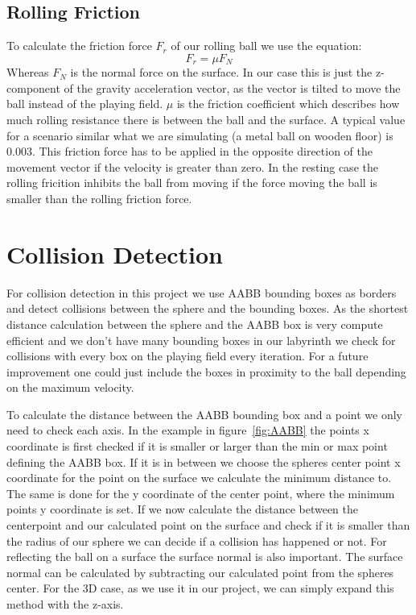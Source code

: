 \documentclass[11pt,a4paper]{article}
\begin{document}
\subsection{Rolling Friction}
\label{subsec:rollingFriction}
To calculate the friction force $F_r$ of our rolling ball we use the equation:
$$F_r=\mu F_N$$
Whereas $F_N$ is the normal force on the surface. In our case this is just the z-component of the gravity acceleration vector, as the vector is tilted to move the ball instead of the playing field.
$\mu$ is the friction coefficient which describes how much rolling resistance there is between the ball and the surface. A typical value for a scenario similar what we are simulating (a metal ball on wooden floor) is 0.003. This friction force has to be applied in the opposite direction of the movement vector if the velocity is greater than zero. In the resting case the rolling fricition inhibits the ball from moving if the force moving the ball is smaller than the rolling friction force.

\section{Collision Detection}
\label{sec:collision}
For collision detection in this project we use AABB bounding boxes as borders and detect collisions between the sphere and the bounding boxes. As the shortest distance calculation between the sphere and the AABB box is very compute efficient and we don't have many bounding boxes in our labyrinth we check for collisions with every box on the playing field every iteration. For a future improvement one could just include the boxes in proximity to the ball depending on the maximum velocity.

To calculate the distance between the AABB bounding box and a point we only need to check each axis.
In the example in figure~\ref{fig:AABB} the points x coordinate is first checked if it is smaller or larger than the min or max point defining the AABB box. If it is in between we choose the spheres center point x coordinate for the point on the surface we calculate the minimum distance to.
The same is done for the y coordinate of the center point, where the minimum points y coordinate is set. If we now calculate the distance between the centerpoint and our calculated point on the surface and check if it is smaller than the radius of our sphere we can decide if a collision has happened or not. For reflecting the ball on a surface the surface normal is also important. The surface normal can be calculated by subtracting our calculated point from the spheres center. For the 3D case, as we use it in our project, we can simply expand this method with the z-axis.
\end{document}
